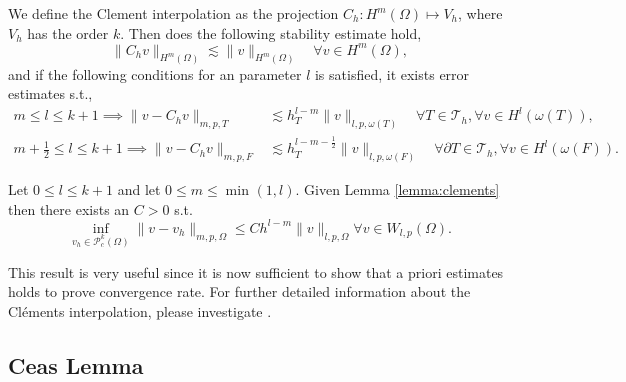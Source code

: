 \begin{lemma}
    \label{lemma:clements}

We define the Clement interpolation as the projection
$C_{h}: H^{m} \left( \Omega  \right) \mapsto V_{h}$, where $V_{h}$ has the order $k$. Then does the following stability estimate hold,
\[
 \| C_{h} v \|_{H^{m}\left( \Omega  \right)   }^{  } \lesssim \| v \|_{ H^{m}\left( \Omega  \right)  }^{  } \quad \forall v \in H^{m}\left( \Omega  \right),
\]
and if the following conditions for an parameter $l$ is satisfied, it exists error estimates s.t.,
\[
    \begin{split}
      m\le l \le k+1  \implies \| v - C_{h} v \|_{ m,p,T   }^{  }  &  \lesssim h^{l-m}_{T} \| v \|_{l,p,\omega \left( T \right)  }^{  } \quad  \forall T \in \mathcal{T} _{h}, \forall v \in H^{l}( \omega \left( T \right)
      ), \\
      m +\frac{1}{2}\le l \le k+1  \implies \| v - C_{h} v \|_{ m,p,F }^{  } & \lesssim h^{l-m- \frac{1}{2}}_{T} \| v \|_{l,p,\omega \left( F \right)  }^{  } \quad  \forall \partial T \in \mathcal{T} _{h}, \forall v \in H^{l}( \omega \left( F
      \right)).
    \end{split}
\]

\end{lemma}


\begin{corollary}
    \label{cor:celement_apriori}
    Let $0 \le l \le k+1$ and let $0\le m \le \min_{} ( 1,l )$.
    Given Lemma \ref{lemma:clements}  then there exists an $C > 0$ s.t.
    \[
    \inf_{v_{h} \in \mathcal{P} ^{k}_{c}( \Omega ) } \| v - v_{h} \|_{  m,p,\Omega }^{  } \le C h^{l-m}  \| v \|_{ l,p,\Omega  }^{  }    \forall v \in W_{l,p}( \Omega ).
    \]
\end{corollary}
This result is very useful since it is now sufficient to show that a priori estimates holds to prove convergence rate. For further detailed information about the Cléments interpolation, please investigate \cite[Chapter 1.6]{ern04}.

\subsection{Ceas Lemma}%
\label{sub:ceas_lemma}


